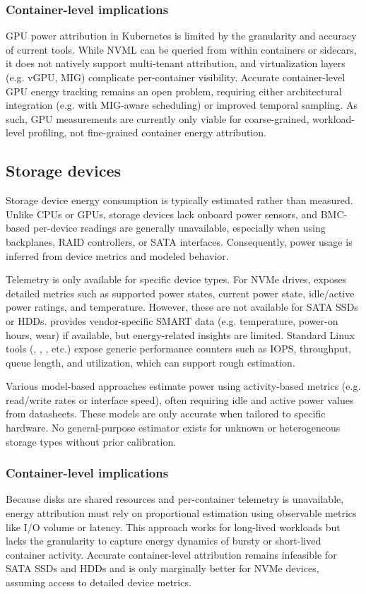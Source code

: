 \subsubsection{Container-level implications}
GPU power attribution in Kubernetes is limited by the granularity and accuracy of current tools. While NVML can be queried from within containers or sidecars, it does not natively support multi-tenant attribution, and virtualization layers (e.g. vGPU, MIG) complicate per-container visibility. Accurate container-level GPU energy tracking remains an open problem, requiring either architectural integration (e.g. with MIG-aware scheduling) or improved temporal sampling. As such, GPU measurements are currently only viable for coarse-grained, workload-level profiling, not fine-grained container energy attribution.

\subsection{Storage devices}

Storage device energy consumption is typically estimated rather than measured. Unlike CPUs or GPUs, storage devices lack onboard power sensors, and BMC-based per-device readings are generally unavailable, especially when using backplanes, RAID controllers, or SATA interfaces. Consequently, power usage is inferred from device metrics and modeled behavior.

Telemetry is only available for specific device types. For NVMe drives,  exposes detailed metrics such as supported power states, current power state, idle/active power ratings, and temperature. However, these are not available for SATA SSDs or HDDs.  provides vendor-specific SMART data (e.g. temperature, power-on hours, wear) if available, but energy-related insights are limited. Standard Linux tools (, , , etc.) expose generic performance counters such as IOPS, throughput, queue length, and utilization, which can support rough estimation.

Various model-based approaches estimate power using activity-based metrics (e.g. read/write rates or interface speed), often requiring idle and active power values from datasheets. These models are only accurate when tailored to specific hardware. No general-purpose estimator exists for unknown or heterogeneous storage types without prior calibration.

\subsubsection{Container-level implications}
Because disks are shared resources and per-container telemetry is unavailable, energy attribution must rely on proportional estimation using observable metrics like I/O volume or latency. This approach works for long-lived workloads but lacks the granularity to capture energy dynamics of bursty or short-lived container activity. Accurate container-level attribution remains infeasible for SATA SSDs and HDDs and is only marginally better for NVMe devices, assuming access to detailed device metrics.


